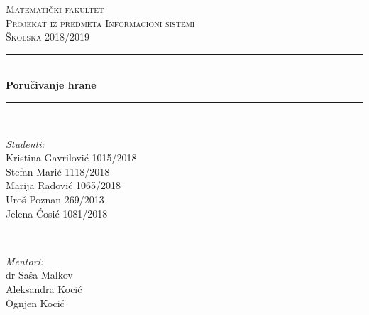\begin{titlepage}

\newcommand{\HRule}{\rule{\linewidth}{0.5mm}} %

\center %
 

\textsc{\LARGE Matematički fakultet}\\[1.5cm] %
\textsc{\Large Projekat iz predmeta Informacioni sistemi}\\[0.5cm] %
\textsc{\large Školska 2018/2019}\\[0.5cm] %


\HRule \\[0.4cm]
{ \huge \bfseries Poručivanje hrane }\\[0.4cm] %
\HRule \\[1cm]
 

\begin{minipage}{0.5\textwidth}
\begin{flushleft} \large
\emph{Studenti:}\\
Kristina Gavrilovi\'c 1015/2018 \\ %
Stefan Mari\'c 1118/2018\\
Marija Radovi\'c 1065/2018\\
Uro\v s Poznan 269/2013 \\
Jelena \'Cosi\'c 1081/2018 \\

\end{flushleft}
\end{minipage}
~
\begin{minipage}{0.4\textwidth}
\begin{flushright} \large
\emph{Mentori:} \\
dr Saša Malkov \\
Aleksandra Koci\'c \\
Ognjen Koci\'c
\end{flushright}
\end{minipage}\\[1.5cm]


\end{titlepage}
